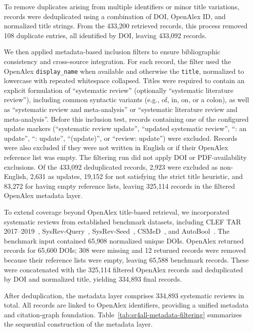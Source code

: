 To remove duplicates arising from multiple identifiers or minor title variations, records were deduplicated using a combination of DOI, OpenAlex ID, and normalized title strings. From the 433,200 retrieved records, this process removed 108 duplicate entries, all identified by DOI, leaving 433,092 records.

We then applied metadata-based inclusion filters to ensure bibliographic consistency and cross-source integration. For each record, the filter used the OpenAlex \texttt{display\_name} when available and otherwise the \texttt{title}, normalized to lowercase with repeated whitespace collapsed. Titles were required to contain an explicit formulation of ``systematic review'' (optionally ``systematic literature review''), including common syntactic variants (e.g., of, in, on, or a colon), as well as ``systematic review and meta-analysis'' or ``systematic literature review and meta-analysis''. Before this inclusion test, records containing one of the configured update markers (``systematic review update'', ``updated systematic review'', ``: an update'', ``: update'', ``(update)'', or ``review: update'') were excluded. Records were also excluded if they were not written in English or if their OpenAlex reference list was empty. The filtering run did not apply DOI or PDF-availability exclusions. Of the 433,092 deduplicated records, 2,923 were excluded as non-English, 2,631 as updates, 19,152 for not satisfying the strict title heuristic, and 83,272 for having empty reference lists, leaving 325,114 records in the filtered OpenAlex metadata layer.

To extend coverage beyond OpenAlex title-based retrieval, we incorporated systematic reviews from established benchmark datasets, including CLEF TAR 2017--2019~\cite{kanoulas:2017,kanoulas:2018,kanoulas:2019}, SysRev-Query~\cite{scells:2017}, SysRev-Seed~\cite{wang:2022}, CSMeD~\cite{kusa:2023}, and AutoBool~\cite{wang:2025b}. The benchmark input contained 65,908 normalized unique DOIs. OpenAlex returned records for 65,600 DOIs; 308 were missing and 12 returned records were removed because their reference lists were empty, leaving 65,588 benchmark records. These were concatenated with the 325,114 filtered OpenAlex records and deduplicated by DOI and normalized title, yielding 334,893 final records.

After deduplication, the metadata layer comprises 334,893 systematic reviews in total. All records are linked to OpenAlex identifiers, providing a unified metadata and  citation-graph foundation. Table~\ref{tab:sr4all-metadata-filtering} summarizes the sequential construction of the metadata layer.

